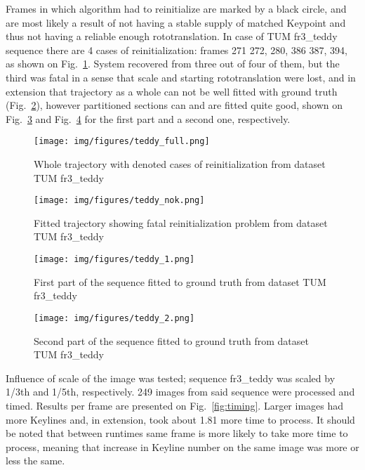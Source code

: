 Frames in which algorithm had to reinitialize are marked by a black circle, and are most likely a result of not having a stable supply of matched Keypoint and thus not having a reliable enough rototranslation. In case of TUM fr3\_teddy sequence there are 4 cases of reinitialization: frames 271 272, 280, 386 387, 394, as shown on Fig.~\ref{fig:teddyfull}. System recovered from three out of four of them, but the third was fatal in a sense that scale and starting rototranslation were lost, and in extension that trajectory as a whole can not be well fitted with ground truth (Fig.~\ref{fig:teddynok}), however partitioned sections can and are fitted quite good, shown on Fig.~\ref{fig:teddy1} and Fig.~\ref{fig:teddy2} for the first part and a second one, respectively.

\begin{figure}[ht]
	\centering\texttt{[image: img/figures/teddy\_full.png]}
	\caption{ Whole trajectory with denoted cases of reinitialization from dataset TUM fr3\_teddy }
	\label{fig:teddyfull}
\end{figure}
\begin{figure}[ht]
	\centering\texttt{[image: img/figures/teddy\_nok.png]}
	\caption{ Fitted trajectory showing fatal reinitialization problem from dataset TUM fr3\_teddy }
	\label{fig:teddynok}
\end{figure}
\begin{figure}[ht]
	\centering\texttt{[image: img/figures/teddy\_1.png]}
	\caption{ First part of the sequence fitted to ground truth from dataset TUM fr3\_teddy }
	\label{fig:teddy1}
\end{figure}
\begin{figure}[ht]
	\centering\texttt{[image: img/figures/teddy\_2.png]}
	\caption{ Second part of the sequence fitted to ground truth from dataset TUM fr3\_teddy }
	\label{fig:teddy2}
\end{figure}


Influence of scale of the image was tested; sequence fr3\_teddy was scaled by 1/3th and 1/5th, respectively. 249 images from said sequence were processed and timed. Results per frame are presented on Fig.~\ref{fig:timing}. Larger images had more Keylines and, in extension, took about 1.81 more time to process. It should be noted that between runtimes same frame is more likely to take more time to process, meaning that increase in Keyline number on the same image was more or less the same.

